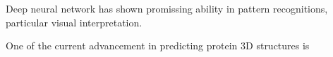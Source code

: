 Deep neural network has shown promissing ability in pattern recognitions, particular visual interpretation.
\par 

One of the current advancement in predicting protein 3D structures is 